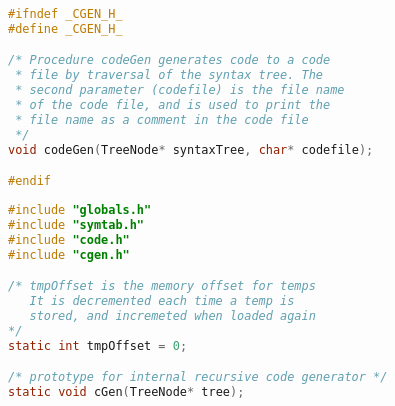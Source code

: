 \documentclass[lang=cn,10pt]{elegantbook}
\begin{document}
\begin{lstlisting}[caption={cgen.h},language=c]
#ifndef _CGEN_H_
#define _CGEN_H_

/* Procedure codeGen generates code to a code
 * file by traversal of the syntax tree. The
 * second parameter (codefile) is the file name
 * of the code file, and is used to print the
 * file name as a comment in the code file
 */
void codeGen(TreeNode* syntaxTree, char* codefile);

#endif
\end{lstlisting}

\begin{lstlisting}[caption={cgen.c},language=c]
#include "globals.h"
#include "symtab.h"
#include "code.h"
#include "cgen.h"

/* tmpOffset is the memory offset for temps
   It is decremented each time a temp is
   stored, and incremeted when loaded again
*/
static int tmpOffset = 0;

/* prototype for internal recursive code generator */
static void cGen(TreeNode* tree);


\end{lstlisting}
\end{document}

